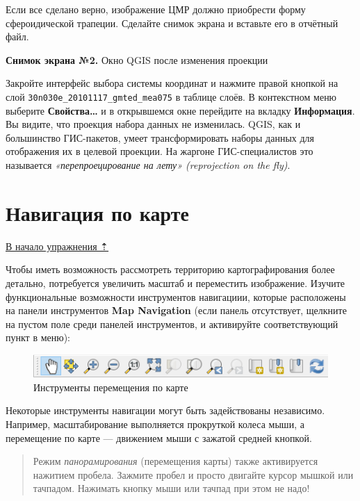 \documentclass[
  12pt,
]{book}
\begin{document}
Если все сделано верно, изображение ЦМР должно приобрести форму сфероидической трапеции. Сделайте снимок экрана и вставьте его в отчётный файл.

\textbf{Снимок экрана №2.} Окно QGIS после изменения проекции

Закройте интерфейс выбора системы координат и нажмите правой кнопкой на слой \texttt{30n030e\_20101117\_gmted\_mea075} в таблице слоёв. В контекстном меню выберите \textbf{Свойства\ldots{}} и в открывшемся окне перейдите на вкладку \textbf{Информация}. Вы видите, что проекция набора данных не изменилась. QGIS, как и большинство ГИС-пакетов, умеет трансформировать наборы данных для отображения их в целевой проекции. На жаргоне ГИС-специалистов это называется \emph{«перепроецирование на лету» (reprojection on the fly)}.

\hypertarget{map-design-general-navigation}{%
\section{Навигация по карте}\label{map-design-general-navigation}}

\protect\hyperlink{map-design-general}{В начало упражнения ⇡}

Чтобы иметь возможность рассмотреть территорию картографирования более детально, потребуется увеличить масштаб и переместить изображение. Изучите функциональные возможности инструментов навигациии, которые расположены на панели инструментов \textbf{Map Navigation} (если панель отсутствует, щелкните на пустом поле среди панелей инструментов, и активируйте соответствующий пункт в меню):

\begin{figure}
\centering
\includegraphics{images/Ex01/NavigationPanel.png}
\caption{Инструменты перемещения по карте}
\end{figure}

Некоторые инструменты навигации могут быть задействованы независимо. Например, масштабирование выполняется прокруткой колеса мыши, а перемещение по карте --- движением мыши с зажатой средней кнопкой.

\begin{quote}
Режим \emph{панорамирования} (перемещения карты) также активируется нажитием пробела. Зажмите пробел и просто двигайте курсор мышкой или тачпадом. Нажимать кнопку мыши или тачпад при этом не надо!
\end{quote}
\end{document}
